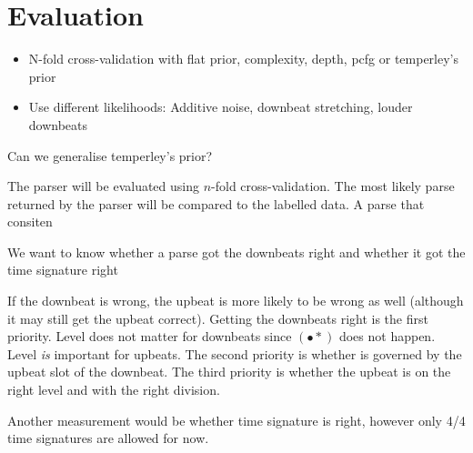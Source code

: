 \section{Evaluation}
\label{sec:evaluation}

\begin{itemize}
\item N-fold cross-validation with flat prior, complexity, depth, pcfg or temperley's prior
\item Use different likelihoods: Additive noise, downbeat stretching, louder downbeats
\end{itemize}

Can we generalise temperley's prior?


The parser will be evaluated using $n$-fold cross-validation. The most likely parse returned by the parser will be compared to the labelled data. A parse that consiten

We want to know whether a parse got the downbeats right and whether it got the time signature right

If the downbeat is wrong, the upbeat is more likely to be wrong as well (although it may still get the upbeat correct). Getting the downbeats right is the first priority. Level does not matter for downbeats since $(\bullet *)$ does not happen. Level \textit{is} important for upbeats. The second priority is whether is governed by the upbeat slot of the downbeat. The third priority is whether the upbeat is on the right level and with the right division.

Another measurement would be whether time signature is right, however only 4/4 time signatures are allowed for now.

